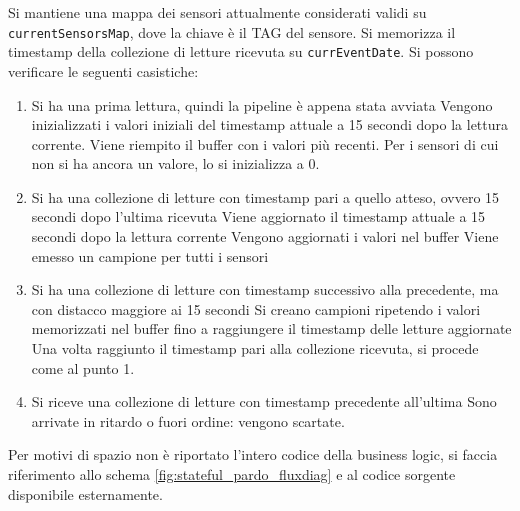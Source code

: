 Si mantiene una mappa dei sensori attualmente considerati validi su \texttt{currentSensorsMap}, dove la chiave è il TAG del sensore. Si memorizza il timestamp della collezione di letture ricevuta su \texttt{currEventDate}. Si possono verificare le seguenti casistiche:
\begin{enumerate}
\item Si ha una prima lettura, quindi la pipeline è appena stata avviata
\subitem Vengono inizializzati i valori iniziali del timestamp attuale a 15 secondi dopo la lettura corrente.
\subitem Viene riempito il buffer con i valori più recenti. Per i sensori di cui non si ha ancora un valore, lo si inizializza a 0.
\item Si ha una collezione di letture con timestamp pari a quello atteso, ovvero 15 secondi dopo l'ultima ricevuta
\subitem Viene aggiornato il timestamp attuale a 15 secondi dopo la lettura corrente
\subitem Vengono aggiornati i valori nel buffer
\subitem Viene emesso un campione per tutti i sensori
\item Si ha una collezione di letture con timestamp successivo alla precedente, ma con distacco maggiore ai 15 secondi
\subitem Si creano campioni ripetendo i valori memorizzati nel buffer fino a raggiungere il timestamp delle letture aggiornate
\subitem Una volta raggiunto il timestamp pari alla collezione ricevuta, si procede come al punto 1.
\item Si riceve una collezione di letture con timestamp precedente all'ultima
\subitem Sono arrivate in ritardo o fuori ordine: vengono scartate.
\end{enumerate}
Per motivi di spazio non è riportato l'intero codice della business logic, si faccia riferimento allo schema \ref{fig:stateful_pardo_fluxdiag} e al codice sorgente disponibile esternamente. %

